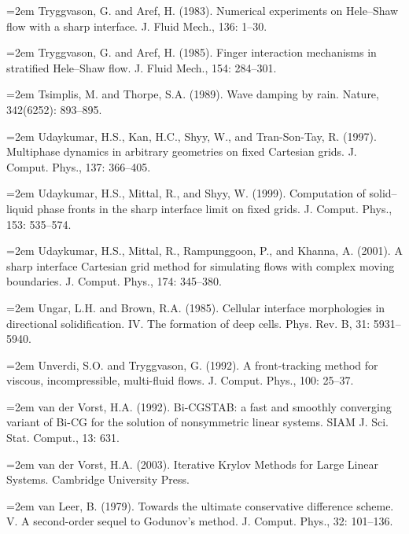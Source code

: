 \documentclass[11pt,a4paper,openany,fontset=none]{ctexbook}
\begin{document}
\par\hangindent=2em Tryggvason, G. and Aref, H. (1983). Numerical experiments on Hele--Shaw flow with a sharp interface. J. Fluid Mech., 136: 1--30.

\par\hangindent=2em Tryggvason, G. and Aref, H. (1985). Finger interaction mechanisms in stratified Hele--Shaw flow. J. Fluid Mech., 154: 284--301.

\par\hangindent=2em Tsimplis, M. and Thorpe, S.A. (1989). Wave damping by rain. Nature, 342(6252): 893--895.

\par\hangindent=2em Udaykumar, H.S., Kan, H.C., Shyy, W., and Tran-Son-Tay, R. (1997). Multiphase dynamics in arbitrary geometries on fixed Cartesian grids. J. Comput. Phys., 137: 366--405.


\par\hangindent=2em Udaykumar, H.S., Mittal, R., and Shyy, W. (1999). Computation of solid--liquid phase fronts in the sharp interface limit on fixed grids. J. Comput. Phys., 153: 535--574.

\par\hangindent=2em Udaykumar, H.S., Mittal, R., Rampunggoon, P., and Khanna, A. (2001). A sharp interface Cartesian grid method for simulating flows with complex moving boundaries. J. Comput. Phys., 174: 345--380.

\par\hangindent=2em Ungar, L.H. and Brown, R.A. (1985). Cellular interface morphologies in directional solidification. IV. The formation of deep cells. Phys. Rev. B, 31: 5931-- 5940.

\par\hangindent=2em Unverdi, S.O. and Tryggvason, G. (1992). A front-tracking method for viscous, incompressible, multi-fluid flows. J. Comput. Phys., 100: 25--37.

\par\hangindent=2em van der Vorst, H.A. (1992). Bi-CGSTAB: a fast and smoothly converging variant of Bi-CG for the solution of nonsymmetric linear systems. SIAM J. Sci. Stat. Comput., 13: 631.

\par\hangindent=2em van der Vorst, H.A. (2003). Iterative Krylov Methods for Large Linear Systems. Cambridge University Press.

\par\hangindent=2em van Leer, B. (1979). Towards the ultimate conservative difference scheme. V. A second-order sequel to Godunov’s method. J. Comput. Phys., 32: 101--136.
\end{document}
